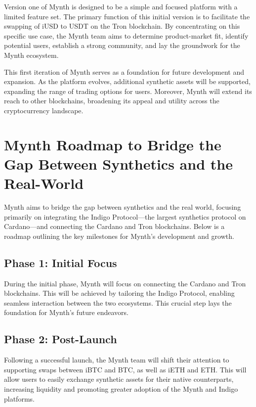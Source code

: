 Version one of Mynth is designed to be a simple and focused platform
with a limited feature set. The primary function of this initial version
is to facilitate the swapping of iUSD to USDT on the Tron blockchain. By
concentrating on this specific use case, the Mynth team aims to
determine product-market fit, identify potential users, establish a
strong community, and lay the groundwork for the Mynth ecosystem.

This first iteration of Mynth serves as a foundation for future
development and expansion. As the platform evolves, additional synthetic
assets will be supported, expanding the range of trading options for
users. Moreover, Mynth will extend its reach to other blockchains,
broadening its appeal and utility across the cryptocurrency landscape.

\pagebreak

\hypertarget{mynth-roadmap-to-bridge-the-gap-between-synthetics-and-the-real-world}{%
\section{Mynth Roadmap to Bridge the Gap Between Synthetics and the
Real-World}\label{mynth-roadmap-to-bridge-the-gap-between-synthetics-and-the-real-world}}

Mynth aims to bridge the gap between synthetics and the real world,
focusing primarily on integrating the Indigo Protocol---the largest
synthetics protocol on Cardano---and connecting the Cardano and Tron
blockchains. Below is a roadmap outlining the key milestones for Mynth's
development and growth.

\hypertarget{phase-1-initial-focus}{%
\subsection{Phase 1: Initial Focus}\label{phase-1-initial-focus}}

During the initial phase, Mynth will focus on connecting the Cardano and
Tron blockchains. This will be achieved by tailoring the Indigo
Protocol, enabling seamless interaction between the two ecosystems. This
crucial step lays the foundation for Mynth's future endeavors.

\hypertarget{phase-2-post-launch}{%
\subsection{Phase 2: Post-Launch}\label{phase-2-post-launch}}

Following a successful launch, the Mynth team will shift their attention
to supporting swaps between iBTC and BTC, as well as iETH and ETH. This
will allow users to easily exchange synthetic assets for their native
counterparts, increasing liquidity and promoting greater adoption of the
Mynth and Indigo platforms.

